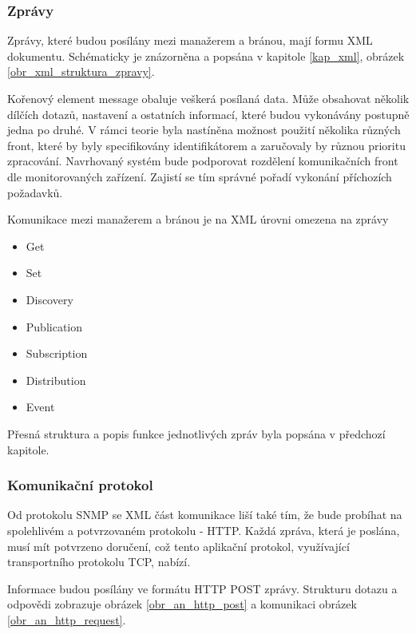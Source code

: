 \subsubsection*{Zprávy}
Zprávy, které budou posílány mezi manažerem a bránou, mají formu XML dokumentu. Schématicky je znázorněna a popsána v kapitole \ref{kap_xml}, obrázek \ref{obr_xml_struktura_zpravy}.

Kořenový element message obaluje veškerá posílaná data. Může obsahovat několik dílčích dotazů, nastavení a ostatních informací, které budou vykonávány postupně
jedna po druhé. V rámci teorie byla nastíněna možnost použití několika různých front, které by byly specifikovány identifikátorem a zaručovaly by různou
prioritu zpracování. Navrhovaný systém bude podporovat rozdělení komunikačních front dle monitorovaných zařízení. Zajistí se tím správné pořadí vykonání
příchozích požadavků.

Komunikace mezi manažerem a bránou je na XML úrovni omezena na zprávy
\begin{itemize}
	\item Get
	\item Set
	\item Discovery
	\item Publication
	\item Subscription
	\item Distribution
	\item Event
\end{itemize}

Přesná struktura a popis funkce jednotlivých zpráv byla popsána v předchozí kapitole.


\subsubsection*{Komunikační protokol}
Od protokolu SNMP se XML část komunikace liší také tím, že bude probíhat na spolehlivém a potvrzovaném protokolu - HTTP. Každá zpráva, která
je poslána, musí mít potvrzeno doručení, což tento aplikační protokol, využívající transportního protokolu TCP, nabízí. 

Informace budou posílány ve formátu HTTP POST zprávy. Strukturu dotazu a odpovědi zobrazuje obrázek \ref{obr_an_http_post} a komunikaci obrázek \ref{obr_an_http_request}.

